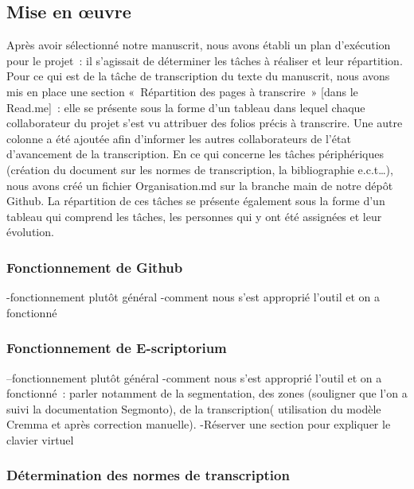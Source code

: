 \documentclass[12pt,a4paper,oneside,titlepage]{article} %
\begin{document}
\subsection{Mise en œuvre}

Après avoir sélectionné notre manuscrit, nous avons établi un plan d'exécution pour le projet : il s’agissait de déterminer les tâches à réaliser et leur répartition. Pour ce qui est de la tâche de transcription du texte du manuscrit, nous avons mis en place une section « Répartition des pages à transcrire » [dans le Read.me] : elle se présente sous la forme d’un tableau dans lequel chaque collaborateur du projet s’est vu attribuer des folios précis à transcrire. Une autre colonne a été ajoutée afin d’informer les autres collaborateurs de l’état d’avancement de la transcription. En ce qui concerne les tâches périphériques (création du document sur les normes de transcription, la bibliographie e.c.t…),  nous avons créé un fichier Organisation.md sur la branche main de notre dépôt Github. La répartition de ces tâches se présente également sous la forme d’un tableau qui comprend les tâches, les personnes qui y ont été assignées et leur évolution.

\subsubsection{Fonctionnement de Github}

-fonctionnement plutôt général
-comment nous s’est approprié l’outil et on a fonctionné

\subsubsection{Fonctionnement de E-scriptorium}

--fonctionnement plutôt général
-comment nous s’est approprié l’outil et on a fonctionné : parler notamment de la segmentation, des zones (souligner que l’on a suivi la documentation Segmonto), de la transcription( utilisation du modèle Cremma et après correction manuelle).
-Réserver une section pour expliquer le clavier virtuel

\subsubsection{Détermination des normes de transcription}
\end{document}
